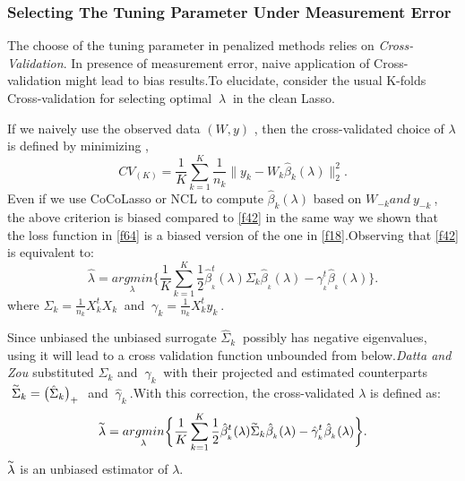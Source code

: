 \documentclass[12pt]{report}
\begin{document}
\subsubsection{Selecting The Tuning Parameter Under Measurement Error}
The choose of the tuning parameter in penalized methods  relies on \textit{Cross-Validation}. In presence of measurement error, naive application of Cross-validation might lead to bias results.To elucidate, consider the usual K-folds Cross-validation  for selecting optimal $\ \lambda\ $ in the clean Lasso.

If we naively use the observed data $(W,y)$ , then the cross-validated choice of $\lambda$ is defined by minimizing ,
\begin{equation}
	CV_{(K)}	=\frac{1}{K} \sum_{k=1}^{K}\frac{1}{n_{k}}\parallel y_{k}-W_{k}\hat{\beta}_{k}(\lambda)\parallel_{2}^{2}.
	\label{f80}
\end{equation}
Even if we use CoCoLasso or NCL to compute $\hat{\beta}_{k}(\lambda)$ based on $W_{-k} and\ y_{-k}\ $, the above criterion is biased compared to \eqref{f42} in the same way we shown that the loss function in \eqref{f64} is a biased version of the one in \eqref{f18}.Observing  that \eqref{f42} is equivalent to:
\begin{equation}
	\hat{\lambda}= \underset{\lambda}{argmin}\bigg\{\frac{1}{K}\sum_{k=1}^{K}\frac{1}{2}\hat{\beta}^{t}_{_{k}}(\lambda)\Sigma_{k}\hat{\beta}_{_{k}}(\lambda)-\gamma^{t}_{_{k}}\hat{\beta}_{_{k}}(\lambda)\bigg\}.
	\label{f81}
\end{equation}
where $\Sigma_{k}=\frac{1}{n_{k}}X_{k}^{t}X_{k}\ $ and $\ \gamma_{k}=\frac{1}{n_{k}}X_{k}^{t}y_{k}\ $.


Since unbiased the unbiased surrogate $\hat{\Sigma}_{k}\ $ possibly has negative eigenvalues, using it will lead to a cross validation function unbounded from below.\textit{Datta and Zou \cite{nref18}} substituted $\Sigma_{k}$ and $\ \gamma_{k}\ $ with their projected and estimated counterparts $\ \overset{_{\thicksim}}{\Sigma}_{k}=\big(\hat{\Sigma}_{k}\big)_{+}\ $ and  $\ \hat{\gamma}_{k}\ $.With this correction, the cross-validated $\lambda$ is defined as:
\begin{equation}
	\overset{_{\thicksim}}{\lambda}= \underset{\lambda}{argmin}\bigg\{\frac{1}{K}\sum_{k=1}^{K}\frac{1}{2}\hat{\beta}^{t}_{_{k}}(\lambda)\overset{_{\thicksim}}{\Sigma}_{k}\hat{\beta}_{_{k}}(\lambda)-\hat{\gamma}^{t}_{_{k}}\hat{\beta}_{_{k}}(\lambda)\bigg\}.
\end{equation}
$\overset{_{\thicksim}}{\lambda}$ is an unbiased estimator  of $\lambda$.
\end{document}
